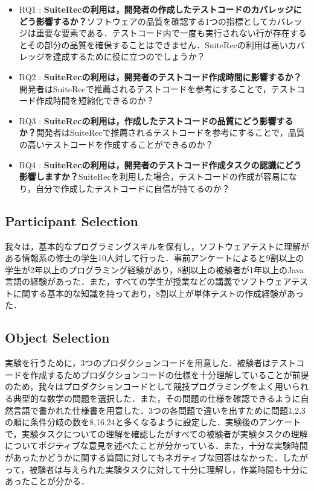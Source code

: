 \documentclass[conference]{IEEEtran}
\begin{document}
\begin{itemize}
\item RQ1 : \textbf{SuiteRecの利用は，開発者の作成したテストコードのカバレッジにどう影響するか？}ソフトウェアの品質を確認する1つの指標としてカバレッジは重要な要素である．テストコード内で一度も実行されない行が存在するとその部分の品質を確保することはできません．SuiteRecの利用は高いカバレッジを達成するために役に立つのでしょうか？
\item RQ2 : \textbf{SuiteRecの利用は，開発者のテストコード作成時間に影響するか？}開発者はSuiteRecで推薦されるテストコードを参考にすることで，テストコード作成時間を短縮化できるのか？
\item RQ3 : \textbf{SuiteRecの利用は，作成したテストコードの品質にどう影響するか？}開発者はSuiteRecで推薦されるテストコードを参考にすることで，品質の高いテストコードを作成することができるのか？
\item RQ4 : \textbf{SuiteRecの利用は，開発者のテストコード作成タスクの認識にどう影響しますか？}SuiteRecを利用した場合，テストコードの作成が容易になり，自分で作成したテストコードに自信が持てるのか？
\end{itemize}

\subsection{Participant Selection}
我々は，基本的なプログラミングスキルを保有し，ソフトウェアテストに理解がある情報系の修士の学生10人対して行った．事前アンケートによると9割以上の学生が2年以上のプログラミング経験があり，8割以上の被験者が1年以上のJava言語の経験があった．また，すべての学生が授業などの講義でソフトウェアテストに関する基本的な知識を持っており，8割以上が単体テストの作成経験があった．

\subsection{Object Selection}
実験を行うために，3つのプロダクションコードを用意した．被験者はテストコードを作成するためプロダクションコードの仕様を十分理解していることが前提のため，我々はプロダクションコードとして競技プログラミングをよく用いられる典型的な数学の問題を選択した．また，その問題の仕様を確認できるように自然言語で書かれた仕様書を用意した．3つの各問題で違いを出すために問題1,2,3の順に条件分岐の数を8,16,24と多くなるように設定した．実験後のアンケートで，実験タスクについての理解を確認したがすべての被験者が実験タスクの理解についてポジティブな意見を述べたことが分かっている．また，十分な実験時間があったかどうかに関する質問に対してもネガティブな回答はなかった．したがって，被験者は与えられた実験タスクに対して十分に理解し，作業時間も十分にあったことが分かる．
\end{document}
